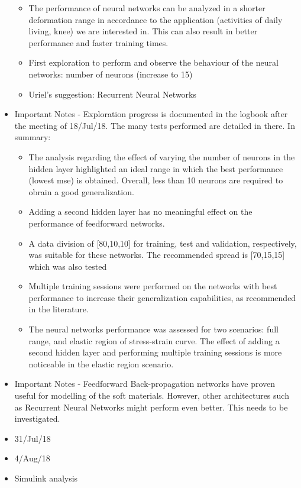\begin{itemize}
\begin{itemize}
        \item The performance of neural networks can be analyzed in a shorter deformation range in accordance to the application (activities of daily living, knee) we are interested in. This can also result in better performance and faster training times.
        \item First exploration to perform and observe the behaviour of the neural networks: number of neurons (increase to 15)
        \item Uriel's suggestion: Recurrent Neural Networks
    \end{itemize}
    \item Important Notes - Exploration progress is documented in the logbook after the meeting of 18/Jul/18. The many tests performed are detailed in there. In summary:
    \begin{itemize}
        \item The analysis regarding the effect of varying the number of neurons in the hidden layer highlighted an ideal range in which the best performance (lowest mse) is obtained. Overall, less than 10 neurons are required to obrain a good generalization.
        \item Adding a second hidden layer has no meaningful effect on the performance of feedforward networks.
        \item A data division of [80,10,10] for training, test and validation, respectively, was suitable for these networks. The recommended spread is [70,15,15] which was also tested
        \item Multiple training sessions were performed on the networks with best performance to increase their generalization capabilities, as recommended in the literature.
        \item The neural networks performance was assessed for two scenarios: full range, and elastic region of stress-strain curve. The effect of adding a second hidden layer and performing multiple training sessions is more noticeable in the elastic region scenario.
    \end{itemize}
    \item Important Notes - Feedforward Back-propagation networks have proven useful for modelling of the soft materials. However, other architectures such as Recurrent Neural Networks might perform even better. This needs to be investigated.
    \item 31/Jul/18
    \item 4/Aug/18
    \item Simulink analysis

\end{itemize}
